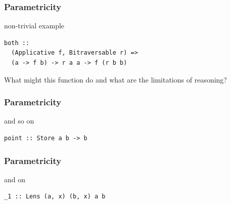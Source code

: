 \begin{frame}[fragile]
\frametitle{Parametricity}
\begin{block}{non-trivial example}
\begin{lstlisting}[style=haskell]
both ::
  (Applicative f, Bitraversable r) =>
  (a -> f b) -> r a a -> f (r b b)
\end{lstlisting}
\end{block}
\begin{center}
What might this function do and what are the limitations of reasoning?
\end{center}
\end{frame}

\begin{frame}[fragile]
\frametitle{Parametricity}
\begin{block}{and so on}
\begin{lstlisting}[style=haskell]
point :: Store a b -> b
\end{lstlisting}
\end{block}
\end{frame}

\begin{frame}[fragile]
\frametitle{Parametricity}
\begin{block}{and on}
\begin{lstlisting}[style=haskell]
_1 :: Lens (a, x) (b, x) a b
\end{lstlisting}
\end{block}
\end{frame}
